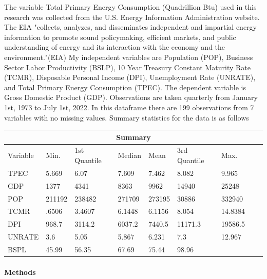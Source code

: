\documentclass[12pt]{article}
\begin{document}
The variable Total Primary Energy Consumption (Quadrillion Btu) used in this research was collected from the U.S. Energy Information Administration website. 
The EIA "collects, analyzes, and disseminates independent and impartial energy information to promote sound policymaking, efficient markets, and public understanding of energy and its interaction with the economy and the environment."(EIA)
My independent variables are Population (POP), Business Sector Labor Productivity (BSLP), 10 Year Treasury Constant Maturity Rate (TCMR), Disposable Personal Income (DPI), Unemployment Rate (UNRATE), and Total Primary Energy Consumption (TPEC). The dependent variable is Gross Domestic Product (GDP).
Observations are taken quarterly from January 1st, 1973 to July 1st, 2022. In this dataframe there are 199 observations from 7 variables with no missing values. 
Summary statistics for the data is as follows






\begin{tabular}{ |p{2cm}||p{2cm}|p{2cm}|p{2cm}|p{2cm}|p{2cm}|p{2cm}|p{2cm}|p{2cm}|}
  \hline
  \multicolumn{9}{|c|}{Summary} \\
  \hline
  Variable & Min. & 1st Quantile & Median & Mean & 3rd Quantile & Max. \\
  \hline
  TPEC & 5.669 & 6.07& 7.609 & 7.462 & 8.082 & 9.965\\
  GDP &  1377 & 4341 & 8363 & 9962 & 14940 & 25248\\
  POP & 211192 & 238482 & 271709 & 273195 & 30886 & 332940\\
  TCMR & .6506 & 3.4607 & 6.1448 & 6.1156 & 8.054 & 14.8384\\
  DPI & 968.7 & 3114.2 & 6037.2 & 7440.5 & 11171.3 & 19586.5\\
  UNRATE & 3.6 & 5.05 & 5.867 & 6.231 & 7.3 & 12.967\\
  BSPL & 45.99 & 56.35 & 67.69 & 75.44 & 98.96\\
  \hline
 \end{tabular}












\paragraph{Methods}
\end{document}
